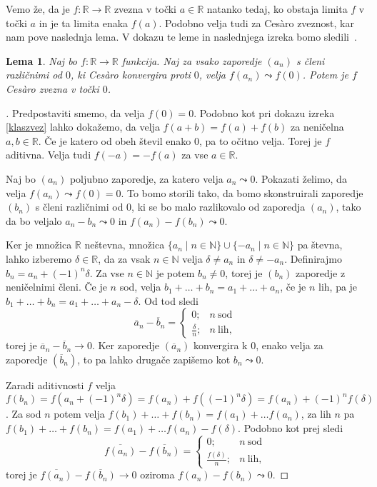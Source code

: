 \documentclass[a4paper,12pt]{article}
\def\N{\mathbb{N}}
\def\R{\mathbb{R}}
\theoremstyle{definition}
\theoremstyle{plain}
\newtheorem{lema}{Lema}
\newenvironment{dokaz}{\begin{proof}[\bfseries\upshape\proofname]}{\end{proof}}
\begin{document}
Vemo že, da je $f: \mathbb{R} \rightarrow \mathbb{R}$ zvezna v točki $a \in \mathbb{R}$ natanko tedaj, ko obstaja limita $f$ v točki $a$ in je ta limita enaka $f(a)$. Podobno velja tudi za Ces\`{a}ro zveznost, kar nam pove naslednja lema. V dokazu te leme in naslednjega izreka bomo sledili~\cite{1}.
\begin{lema}
    \label{lema}
    Naj bo $f: \mathbb{R} \rightarrow \mathbb{R}$ funkcija. Naj za vsako zaporedje $(a_n)$ s členi različnimi od $0$, ki Ces\`{a}ro konvergira proti $0$, velja $f(a_n) \leadsto f(0)$. Potem je $f$ Ces\`{a}ro zvezna v točki $0$.
\end{lema}
\begin{dokaz}
    Predpostaviti smemo, da velja $f(0) = 0$. Podobno kot pri dokazu izreka \ref{klaszvez} lahko dokažemo, da velja $f(a+b) = f(a) + f(b)$ za neničelna $a, b \in \mathbb{R}$. Če je katero od obeh števil enako $0$, pa to očitno velja. Torej je $f$ aditivna. Velja tudi $f(-a) = -f(a)$ za vse $a \in \R$.
    
    Naj bo $(a_n)$ poljubno zaporedje, za katero velja $a_n \leadsto 0$. Pokazati želimo, da velja $f(a_n) \leadsto f(0) = 0$. To bomo storili tako, da bomo skonstruirali zaporedje $(b_n)$ s členi različnimi od $0$, ki se bo malo razlikovalo od zaporedja $(a_n)$, tako da bo veljalo $a_n - b_n \leadsto 0$ in $f(a_n) - f(b_n) \leadsto 0$.

    Ker je množica $\R$ neštevna, množica $\{a_n \mid n \in \N\} \cup \{-a_n \mid n \in \N\}$ pa števna, lahko izberemo $\delta \in \R$, da za vsak $n \in \N$ velja $\delta \neq a_n$ in $\delta \neq -a_n$. Definirajmo $b_n = a_n + (-1)^n \delta$. Za vse $n \in \N$ je potem $b_n \neq 0$, torej je $(b_n)$ zaporedje z neničelnimi členi. Če je $n$ sod, velja $b_1 + \ldots + b_n = a_1 + \ldots + a_n$, če je $n$ lih, pa je $b_1 + \ldots + b_n = a_1 + \ldots + a_n - \delta$. Od tod sledi
    $$
    \overline{a}_n - \overline{b}_n = \begin{cases}
        0; & n \ \text{sod}\\
        \frac{\delta}{n}; & n \ \text{lih},
    \end{cases}
    $$
    torej je $\overline{a}_n - \overline{b}_n \rightarrow 0$. Ker zaporedje $(\overline{a}_n)$ konvergira k 0, enako velja za zaporedje $(\overline{b}_n)$, to pa lahko drugače zapišemo kot $b_n \leadsto 0$.

    Zaradi aditivnosti $f$ velja $f(b_n) = f(a_n + (-1)^n \delta) = f(a_n) + f((-1)^n \delta) = f(a_n) + (-1)^n f(\delta)$. Za sod $n$ potem velja $f(b_1) + \ldots + f(b_n) = f(a_1) + \ldots f(a_n)$, za lih $n$ pa $f(b_1) + \ldots + f(b_n) = f(a_1) + \ldots f(a_n) - f(\delta)$. Podobno kot prej sledi
    $$
    \overline{f(a_n)} - \overline{f(b_n)} = \begin{cases}
        0; & n \ \text{sod}\\
        \frac{f(\delta)}{n}; & n \ \text{lih},
    \end{cases}
    $$
    torej je $\overline{f(a_n)} - \overline{f(b_n)} \rightarrow 0$ oziroma $f(a_n) - f(b_n) \leadsto 0$.


\end{dokaz}
\end{document}
